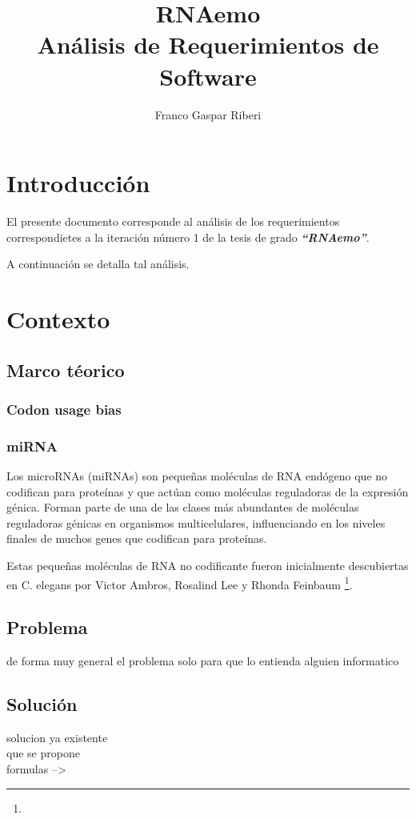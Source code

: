 \documentclass[12pt,a4paper,spanish]{article}
\title{\textbf{RNAemo}\\ \vspace{0.45cm} Análisis de Requerimientos de Software} %
\author{Franco Gaspar Riberi}
\begin{document}
\maketitle\pagebreak{}\tableofcontents{}\pagebreak{}

\newpage


\section{Introducción}
	\par El presente documento corresponde al análisis de los requerimientos correspondietes a
	la iteración número 1 de la tesis de grado \textit{\textbf{``RNAemo''}}.
	\par A continuación se detalla tal análisis.

\section{Contexto}
	\subsection{Marco téorico}
		\subsubsection{Codon usage bias}
		
		\subsubsection{miRNA}
			\par Los microRNAs (miRNAs) son pequeñas moléculas de RNA endógeno que no 
			codifican para proteínas y que actúan como moléculas reguladoras de la expresión
			génica. Forman parte de una de las clases más abundantes de moléculas reguladoras génicas en organismos
			multicelulares, influenciando en los niveles finales de muchos genes que codifican para
			proteínas.
			\par Estas pequeñas moléculas de RNA no codificante fueron inicialmente descubiertas en
			C. elegans por Victor Ambros, Rosalind Lee y Rhonda Feinbaum \footnote{}.

	\subsection{Problema}
			de forma muy general el problema solo para que lo entienda alguien informatico
	\subsection{Solución}
		solucion ya existente \\
		que se propone \\
		formulas -->
		
\end{document}
